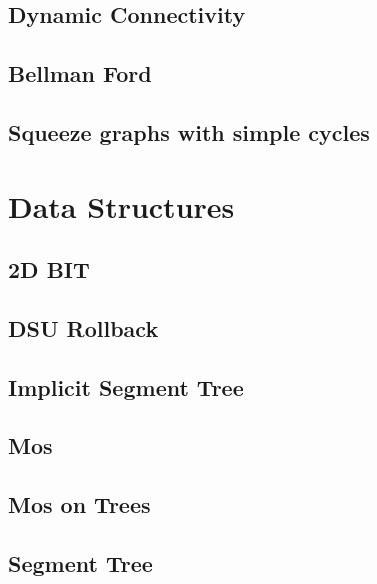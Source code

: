 \subsection{   Dynamic Connectivity}
\raggedbottom
\hrulefill
\subsection{   Bellman Ford}
\raggedbottom
\hrulefill
\subsection{   Squeeze graphs with simple cycles}
\raggedbottom
\hrulefill

\section{Data Structures}
\subsection{   2D BIT}
\raggedbottom
\hrulefill
\subsection{   DSU Rollback}
\raggedbottom
\hrulefill
\subsection{   Implicit Segment Tree}
\raggedbottom
\hrulefill
\subsection{   Mos}
\raggedbottom
\hrulefill
\subsection{   Mos on Trees}
\raggedbottom
\hrulefill
\subsection{   Segment Tree}
\raggedbottom
\hrulefill
